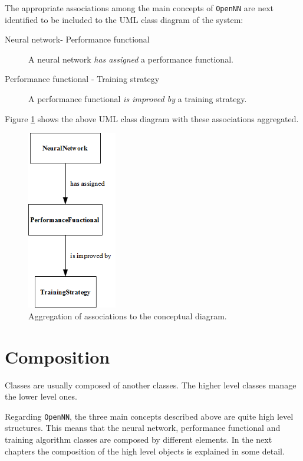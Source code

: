 The appropriate associations among the main concepts of \texttt{OpenNN} are next identified to
be included to the UML class diagram of the system:

\begin{description}
\item[Neural network- Performance functional]
A neural network \textit{has assigned} a performance
functional.
\item[Performance functional - Training strategy]
A performance functional \textit{is improved by} a training
strategy.
\end{description}

Figure \ref{AssociationDiagram} shows the above UML class diagram
with these associations aggregated.

\begin{figure}[h!]
\begin{center}
\includegraphics[width=0.35\textwidth]{software_model_basis/association_diagram}
\caption{Aggregation of associations to the conceptual diagram.}\label{AssociationDiagram}
\end{center}
\end{figure}

\section{Composition}


Classes are usually composed of another classes. The higher level classes manage the lower level ones. 


Regarding \texttt{OpenNN}, the three main concepts described above are quite high level structures. 
This means that the neural network, performance functional and training algorithm classes are composed by different elements. 
In the next chapters the composition of the high level objects is explained in some detail. 


